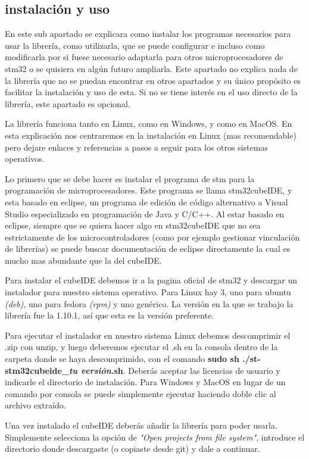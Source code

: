\documentclass{report}
\begin{document}
\subsection{instalación y uso}
En este sub apartado se explicara como instalar los programas necesarios para usar la librería, como utilizarla, que se puede configurar e incluso como modificarla por si fuese necesario adaptarla para otros microprocesadores de stm32 o se quisiera en algún futuro ampliarla. Este apartado no explica nada de la librería que no se puedan encontrar en otros apartados y su único propósito es facilitar la instalación y uso de esta. Si no se tiene interés en el uso directo de la librería, este apartado es opcional. 
\par
La librería funciona tanto en Linux, como en Windows, y como en MacOS. En esta explicación nos centraremos en la instalación en Linux (mas recomendable) pero dejare enlaces y referencias a pasos a seguir para los otros sistemas operativos. 
\par \vspace{0.3 cm}
Lo primero que se debe hacer es instalar el programa de stm para la programación de microprocesadores. Este programa se llama stm32cubeIDE, y esta basado en eclipse, un programa de edición de código alternativo a Visual Studio especializado en programación de Java y C/C++. Al estar basado en eclipse, siempre que se quiera hacer algo en stm32cubeIDE que no sea estrictamente de los microcontroladores (como por ejemplo gestionar vinculación de librerías) se puede buscar documentación de eclipse directamente la cual es mucho mas abundante que la del cubeIDE. \par
Para instalar el cubeIDE debemos ir a la pagina oficial de stm32 \cite{web:STM32:installationCube} y descargar un instalador para nuestro sistema operativo. Para Linux hay 3, uno para ubuntu \textit{(deb)}, uno para fedora \textit{(rpm)} y uno genérico. La versión en la que se trabajo la librería fue la 1.10.1, así que esta es la versión preferente. \par
Para ejecutar el instalador en nuestro sistema Linux debemos descomprimir el .zip con unzip, y luego deberemos ejecutar el .sh en la consola dentro de la carpeta donde se haya descomprimido, con el comando \textbf{sudo sh ./st-stm32cubeide\_\textit{tu versión}.sh}. Deberás aceptar las licencias de usuario y indicarle el directorio de instalación. Para Windows y MacOS en lugar de un comando por consola se puede simplemente ejecutar haciendo doble clic al archivo extraído. 
\par \vspace{0.3 cm}
Una vez instalado el cubeIDE deberás añadir la librería para poder usarla. Simplemente selecciona la opción de \textit{"Open projects from file system"}, introduce el directorio donde descargaste (o copiaste desde git) y dale a continuar. \par
\end{document}
